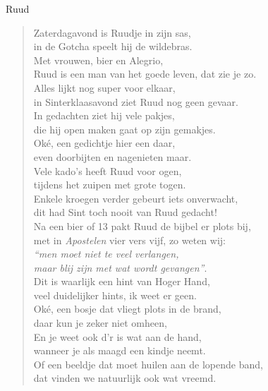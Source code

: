 \documentclass[12pt]{brief}
\date{11 december 2005}
\begin{document}
\begin{letter}{Ruud}

\opening{}


\begin{verse}

Zaterdagavond is Ruudje in zijn sas,\\
in de Gotcha speelt hij de wildebras.\\
Met vrouwen, bier en Alegrio,\\
Ruud is een man van het goede leven, dat zie je zo.\\[0.5em]

Alles lijkt nog super voor elkaar,\\
in Sinterklaasavond ziet Ruud nog geen gevaar.\\
In gedachten ziet hij vele pakjes,\\
die hij open maken gaat op zijn gemakjes.\\[0.5em]

Ok\'e, een gedichtje hier een daar,\\
even doorbijten en nagenieten maar.\\
Vele kado's heeft Ruud voor ogen,\\
tijdens het zuipen met grote togen.\\[0.5em]

Enkele kroegen verder gebeurt iets onverwacht,\\
dit had Sint toch nooit van Ruud gedacht!\\
Na een bier of 13 pakt Ruud de bijbel er plots bij,\\
met in \emph{Apostelen} vier vers vijf, zo weten wij:\\
\emph{``men moet niet te veel verlangen,\\
maar blij zijn met wat wordt gevangen''}.\\[0.5em]

Dit is waarlijk een hint van Hoger Hand,\\
veel duidelijker hints, ik weet er geen.\\
Ok\'e, een bosje dat vliegt plots in de brand,\\
daar kun je zeker niet omheen,\\
En je weet ook d'r is wat aan de hand,\\
wanneer je als maagd een kindje neemt.\\
Of een beeldje dat moet huilen aan de lopende band,\\
dat vinden we natuurlijk ook wat vreemd.\\[0.5em]


\end{verse}
\end{letter}
\end{document}
